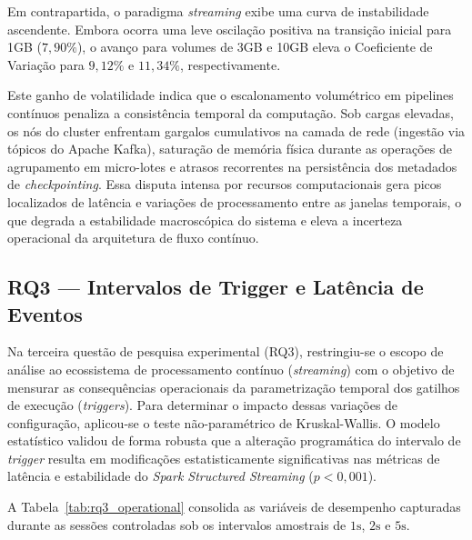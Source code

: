 Em contrapartida, o paradigma \textit{streaming} exibe uma curva de instabilidade ascendente. Embora ocorra uma leve oscilação positiva na transição inicial para 1GB ($7{,}90\%$), o avanço para volumes de 3GB e 10GB eleva o Coeficiente de Variação para $9{,}12\%$ e $11{,}34\%$, respectivamente. 

Este ganho de volatilidade indica que o escalonamento volumétrico em pipelines contínuos penaliza a consistência temporal da computação. Sob cargas elevadas, os nós do cluster enfrentam gargalos cumulativos na camada de rede (ingestão via tópicos do Apache Kafka), saturação de memória física durante as operações de agrupamento em micro-lotes e atrasos recorrentes na persistência dos metadados de \textit{checkpointing}. Essa disputa intensa por recursos computacionais gera picos localizados de latência e variações de processamento entre as janelas temporais, o que degrada a estabilidade macroscópica do sistema e eleva a incerteza operacional da arquitetura de fluxo contínuo.

\subsection{RQ3 --- Intervalos de Trigger e Latência de Eventos}
Na terceira questão de pesquisa experimental (RQ3), restringiu-se o escopo de análise ao ecossistema de processamento contínuo (\textit{streaming}) com o objetivo de mensurar as consequências operacionais da parametrização temporal dos gatilhos de execução (\textit{triggers}). Para determinar o impacto dessas variações de configuração, aplicou-se o teste não-paramétrico de Kruskal-Wallis. O modelo estatístico validou de forma robusta que a alteração programática do intervalo de \textit{trigger} resulta em modificações estatisticamente significativas nas métricas de latência e estabilidade do \textit{Spark Structured Streaming} ($p < 0{,}001$). 

A Tabela~\ref{tab:rq3_operational} consolida as variáveis de desempenho capturadas durante as sessões controladas sob os intervalos amostrais de $1\text{s}$, $2\text{s}$ e $5\text{s}$.

